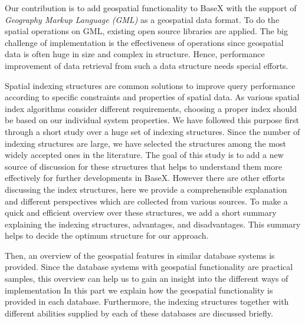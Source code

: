 \documentclass[a4paper,12pt]{article}
\begin{document}
Our contribution is to add geospatial functionality to BaseX with the support of \emph{Geography Markup Language (GML)} as a geospatial data format. 
To do the spatial operations on GML, existing open source libraries are applied.
The big challenge of implementation is the effectiveness of operations
since geospatial data is often huge in size and complex in structure.
Hence, performance improvement of data retrieval from such a data structure 
needs special efforts. 

Spatial indexing structures are common solutions to improve query performance according to specific constraints and properties of spatial data.
As various spatial index algorithms consider different requirements, choosing a proper index should be based on our individual system properties.
We have followed this purpose first through a short study over a huge set of indexing structures.
Since the number of indexing structures are large, 
we have selected the structures among the most widely accepted ones in the literature.
The goal of this study is to add a new source of discussion 
for these structures that helps to understand them more effectively for further developments in BaseX. 
However there are other efforts discussing the index structures, 
here we provide a comprehensible explanation and different perspectives which are collected from various sources.
To make a quick and efficient overview over these structures, 
we add a short summary explaining the indexing structures, advantages, and disadvantages.
This summary helps to decide the optimum structure for our approach. 

Then, an overview of the geospatial features in similar database systems is provided. Since the database systems with geospatial functionality are practical samples, this overview can help us to gain an insight into the different ways of implementation%
In this part we explain how the geospatial functionality is provided in each database.
Furthermore, the indexing structures together with different abilities
supplied by each of these databases are discussed briefly.
\end{document}
